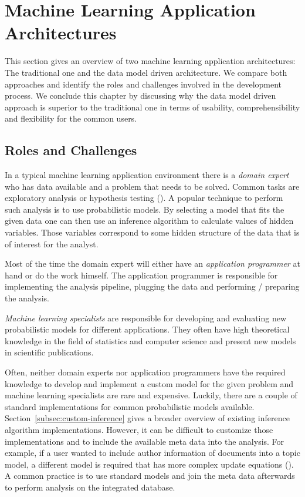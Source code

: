 \section{Machine Learning Application Architectures}

This section gives an overview of two machine learning application architectures: The traditional one and the data model driven architecture. We compare both approaches and identify the roles and challenges involved in the development process. We conclude this chapter by discussing why the data model driven approach is superior to the traditional one in terms of usability, comprehensibility and flexibility for the common users.

\subsection{Roles and Challenges}

In a typical machine learning application environment there is a \emph{domain expert} who has data available and a problem that needs to be solved. Common tasks are exploratory analysis or hypothesis testing (\cite{tukey1980we}). A popular technique to perform such analysis is to use probabilistic models. By selecting a model that fits the given data one can then use an inference algorithm to calculate values of hidden variables. Those variables correspond to some hidden structure of the data that is of interest for the analyst.

Most of the time the domain expert will either have an \emph{application programmer} at hand or do the work himself. The application programmer is responsible for implementing the analysis pipeline, plugging the data and performing / preparing the analysis.

\emph{Machine learning specialists} are responsible for developing and evaluating new probabilistic models for different applications. They often have high theoretical knowledge in the field of statistics and computer science and present new models in scientific publications.

Often, neither domain experts nor application programmers have the required knowledge to develop and implement a custom model for the given problem and machine learning specialists are rare and expensive. Luckily, there are a couple of standard implementations for common probabilistic models available. Section~\ref{subsec:custom-inference} gives a broader overview of existing inference algorithm implementations. However, it can be difficult to customize those implementations and to include the available meta data into the analysis. For example, if a user wanted to include author information of documents into a topic model, a different model is required that has more complex update equations (\cite{rosen2004author}). A common practice is to use standard models and join the meta data afterwards to perform analysis on the integrated database.


